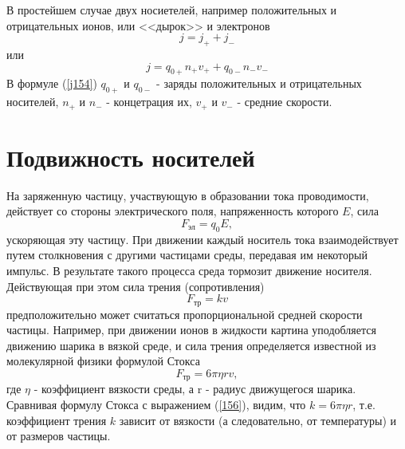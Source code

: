 \documentclass[a4paper,10pt]{book}
\begin{document}
В простейшем случае двух носиетелей, например положительных и отрицательных ионов, или <<дырок>> и электронов
\begin{equation*}
 j = j_+ + j_-
\end{equation*}
или
\begin{equation}\label{j154}
  j = q_{0+}n_+v_+ + q_{0-}n_-v_-
\end{equation}
В формуле (\ref{j154}) $q_{0+}$ и $q_{0-}$ - заряды положительных и отрицательных носителей, $n_+$ и $n_-$ - концетрация их, $v_+$ и $v_-$ 
- средние скорости.
\section{Подвижность носителей}
На заряженную частицу, участвующую в образовании тока проводимости, действует со стороны электрического поля, напряженность которого $E$, сила
\begin{equation}\label{155}
 F_\text{эл} = q_0E,
\end{equation}
ускоряющая эту частицу. При движении каждый носитель тока взаимодействует путем столкновения с другими частицами среды, передавая им некоторый 
импульс. В результате такого процесса среда тормозит движение носителя. Действующая при этом сила трения (сопротивления)
\begin{equation}\label{156}
 F_\text{тр} = kv
\end{equation}
предположительно может считаться пропорциональной средней скорости частицы. Например, при движении ионов в жидкости картина уподобляется движению 
шарика в вязкой среде, и сила трения определяется известной из молекулярной физики формулой Стокса
\begin{equation}
 F_\text{тр} = 6\pi \eta r v, 
\end{equation}
где $\eta$ - коэффициент вязкости среды, а r - радиус движущегося шарика.
Сравнивая формулу Стокса с выражением (\ref{156}), видим, что $k = 6\pi \eta r$, т.е. коэффициент трения $k$ зависит от вязкости (а следовательно, 
от температуры) и от размеров частицы.
\end{document}
